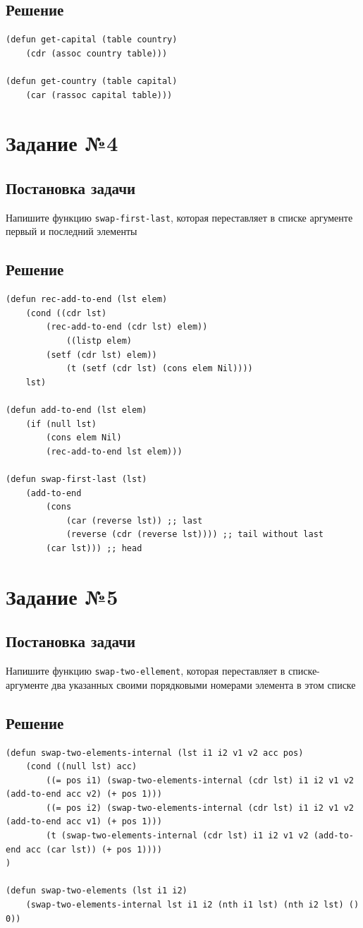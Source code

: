 \documentclass[12pt]{report}
\begin{document}
\subsection*{Решение}
\begin{lstlisting}
(defun get-capital (table country)
	(cdr (assoc country table)))

(defun get-country (table capital)
	(car (rassoc capital table)))
\end{lstlisting}


\section*{Задание №4}
\subsection*{Постановка задачи}
Напишите функцию \texttt{swap-first-last}, которая переставляет в списке аргументе первый и последний элементы

\subsection*{Решение}
\begin{lstlisting}
(defun rec-add-to-end (lst elem)
	(cond ((cdr lst)
		(rec-add-to-end (cdr lst) elem))
			((listp elem)
		(setf (cdr lst) elem))
			(t (setf (cdr lst) (cons elem Nil))))
	lst)

(defun add-to-end (lst elem)
	(if (null lst)
		(cons elem Nil)
		(rec-add-to-end lst elem)))

(defun swap-first-last (lst)
	(add-to-end
		(cons
			(car (reverse lst)) ;; last
			(reverse (cdr (reverse lst)))) ;; tail without last
		(car lst))) ;; head
\end{lstlisting}

\section*{Задание №5}
\subsection*{Постановка задачи}
Напишите функцию \texttt{swap-two-ellement}, которая переставляет в списке-аргументе два указанных своими порядковыми номерами элемента в этом списке

\subsection*{Решение}
\begin{lstlisting}
(defun swap-two-elements-internal (lst i1 i2 v1 v2 acc pos)
	(cond ((null lst) acc)
		((= pos i1) (swap-two-elements-internal (cdr lst) i1 i2 v1 v2 (add-to-end acc v2) (+ pos 1)))
		((= pos i2) (swap-two-elements-internal (cdr lst) i1 i2 v1 v2 (add-to-end acc v1) (+ pos 1)))
		(t (swap-two-elements-internal (cdr lst) i1 i2 v1 v2 (add-to-end acc (car lst)) (+ pos 1))))
)

(defun swap-two-elements (lst i1 i2)
	(swap-two-elements-internal lst i1 i2 (nth i1 lst) (nth i2 lst) () 0))
\end{lstlisting}
\end{document}
